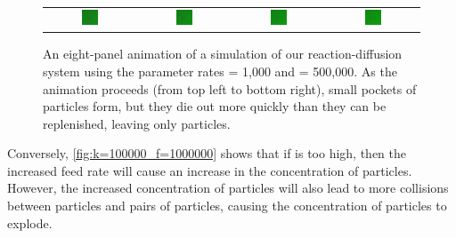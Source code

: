 \begin{figure}[h]
\begin{tabular}{c c c c}
\includegraphics[width = 0.19\textwidth]{../images/predator_prey_predator_dies_f1e1_r5e5_i4.png} & \includegraphics[width = 0.19\textwidth]{../images/../images/predator_prey_predator_dies_f1e1_r5e5_i5.png} & \includegraphics[width = 0.19\textwidth]{../images/../images/predator_prey_predator_dies_f1e1_r5e5_i6.png} & \includegraphics[width = 0.19\textwidth]{../images/../images/predator_prey_predator_dies_f1e1_r5e5_i7.png}
\end{tabular}
\caption{An eight-panel animation of a simulation of our reaction-diffusion system using the parameter rates  = 1,000 and  = 500,000. As the animation proceeds (from top left to bottom right), small pockets of  particles form, but they die out more quickly than they can be replenished, leaving only  particles.}
\label{fig:k=500000_f=1000}
\end{figure}

Conversely, \autoref{fig:k=100000_f=1000000} shows that if  is too high, then the increased feed rate will cause an increase in the concentration of  particles. However, the increased concentration of  particles will also lead to more collisions between  particles and pairs of  particles, causing the concentration of  particles to explode.\\

